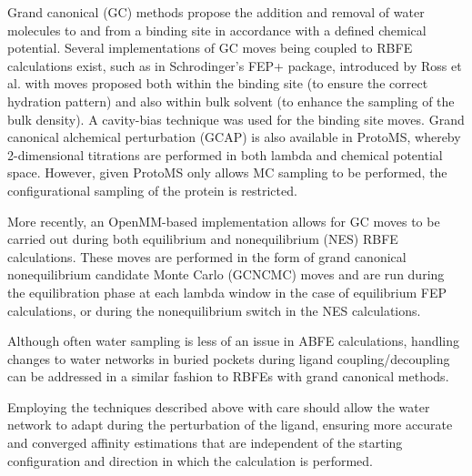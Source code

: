 \documentclass[9pt,bestpractices]{livecoms}
\begin{document}
Grand canonical (GC) methods propose the addition and removal of water molecules to and from a binding site in accordance with a defined chemical potential. Several implementations of GC moves being coupled to RBFE calculations exist, such as in Schrodinger's FEP+ package, introduced by Ross et al.\cite{ross2020enhancing} with moves proposed both within the binding site (to ensure the correct hydration pattern) and also within bulk solvent (to enhance the sampling of the bulk density). A cavity-bias technique was used for the binding site moves. Grand canonical alchemical perturbation (GCAP)\cite{brucemacdonald2018ligand} is also available in ProtoMS\cite{woods2018protoms}, whereby 2-dimensional titrations are performed in both lambda and chemical potential space. However, given ProtoMS only allows MC sampling to be performed, the configurational sampling of the protein is restricted.

More recently, an OpenMM-based implementation allows for GC moves to be carried out during both equilibrium and nonequilibrium (NES) RBFE calculations\cite{melling2025developing}. These moves are performed in the form of grand canonical nonequilibrium candidate Monte Carlo (GCNCMC) moves\cite{melling2023enhanced} and are run during the equilibration phase at each lambda window in the case of equilibrium FEP calculations, or during the nonequilibrium switch in the NES calculations.

Although often water sampling is less of an issue in ABFE calculations, handling changes to water networks in buried pockets during ligand coupling/decoupling can be addressed in a similar fashion to RBFEs with grand canonical methods.


Employing the techniques described above with care should allow the water network to adapt during the perturbation of the ligand, ensuring more accurate and converged affinity estimations that are independent of the starting configuration and direction in which the calculation is performed.
\end{document}
